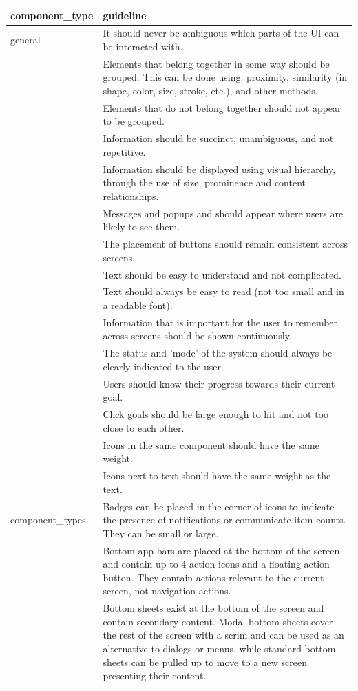 \documentclass[11pt,titlepage,oneside,openany]{book}
\begin{document}
\begin{longtable}{|p{}|p{}|}
	\hline
	component\_type & guideline \\ \hline
	general & It should never be ambiguous which parts of the UI can be interacted with. \\ 
	~ & Elements that belong together in some way should be grouped. This can be done using: proximity, similarity (in shape, color, size, stroke, etc.), and other methods. \\ 
	~ & Elements that do not belong together should not appear to be grouped. \\ 
	~ & Information should be succinct, unambiguous, and not repetitive. \\ 
	~ & Information should be displayed using visual hierarchy, through the use of size, prominence and content relationships. \\ 
	~ & Messages and popups and should appear where users are likely to see them. \\ 
	~ & The placement of buttons should remain consistent across screens. \\ 
	~ & Text should be easy to understand and not complicated. \\ 
	~ & Text should always be easy to read (not too small and in a readable font). \\ 
	~ & Information that is important for the user to remember across screens should be shown continuously. \\ 
	~ & The status and 'mode' of the system should always be clearly indicated to the user. \\ 
	~ & Users should know their progress towards their current goal. \\ 
	~ & Click goals should be large enough to hit and not too close to each other. \\ 
	~ & Icons in the same component should have the same weight. \\ 
	~ & Icons next to text should have the same weight as the text. \\ \hline
	component\_types & Badges can be placed in the corner of icons to indicate the presence of notifications or communicate item counts. They can be small or large. \\ 
	~ & Bottom app bars are placed at the bottom of the screen and contain up to 4 action icons and a floating action button. They contain actions relevant to the current screen, not navigation actions. \\ 
	~ & Bottom sheets exist at the bottom of the screen and contain secondary content. Modal bottom sheets cover the rest of the screen with a scrim and can be used as an alternative to dialogs or menus, while standard bottom sheets can be pulled up to move to a new screen presenting their content. \\ 

\end{longtable}
\end{document}
